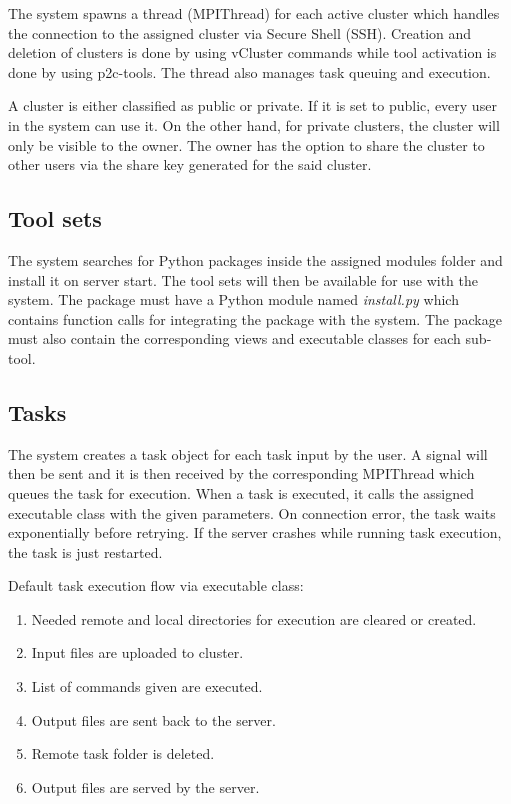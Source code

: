 The system spawns a thread (MPIThread) for each active cluster which handles the connection to the assigned cluster via Secure Shell (SSH). Creation and deletion of clusters is done by using vCluster commands while tool activation is done by using p2c-tools. The thread also manages task queuing and execution.
		
A cluster is either classified as public or private. If it is set to public, every user in the system can use it. On the other hand, for private clusters, the cluster will only be visible to the owner. The owner has the option to share the cluster to other users via the share key generated for the said cluster. 		

\subsection{Tool sets} 
The system searches for Python packages inside the assigned modules folder and install it on server start. The tool sets will then be available for use with the system. The package must have a Python module named \emph{install.py} which contains function calls for integrating the package with the system. The package must also contain the corresponding views and executable classes for each sub-tool.  

\subsection{Tasks} 
The system creates a task object for each task input by the user. A signal will then be sent and it is then received by the corresponding MPIThread which queues the task for execution. When a task is executed, it calls the assigned executable class with the given parameters. On connection error, the task waits exponentially before retrying. If the server crashes while running task execution, the task is just restarted.				
		
Default task execution flow via executable class:			
	\begin{enumerate}
		\item  Needed remote and local directories for execution are cleared or created.
		\item  Input files are uploaded to cluster.
		\item  List of commands given are executed.
		\item  Output files are sent back to the server.
		\item  Remote task folder is deleted.
		\item  Output files are served by the server.
	\end{enumerate}	

